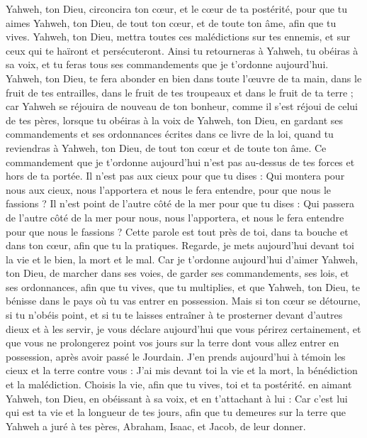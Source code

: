 \begin{multicols}{2}
Yahweh, ton Dieu, circoncira ton cœur, et le cœur de ta postérité, pour que tu aimes Yahweh, ton Dieu, de tout ton cœur, et de toute ton âme, afin que tu vives.
Yahweh, ton Dieu, mettra toutes ces malédictions sur tes ennemis, et sur ceux qui te haïront et persécuteront.
Ainsi tu retourneras à Yahweh, tu obéiras à sa voix, et tu feras tous ses commandements que je t’ordonne aujourd'hui.
Yahweh, ton Dieu, te fera abonder en bien dans toute l’œuvre de ta main, dans le fruit de tes entrailles, dans le fruit de tes troupeaux et dans le fruit de ta terre ; car Yahweh se réjouira de nouveau de ton bonheur, comme il s'est réjoui de celui de tes pères,
lorsque tu obéiras à la voix de Yahweh, ton Dieu, en gardant ses commandements et ses ordonnances écrites dans ce livre de la loi, quand tu reviendras à Yahweh, ton Dieu, de tout ton cœur et de toute ton âme.
Ce commandement que je t’ordonne aujourd'hui n'est pas au-dessus de tes forces et hors de ta portée.
Il n'est pas aux cieux pour que tu dises : Qui montera pour nous aux cieux, nous l’apportera et nous le fera entendre, pour que nous le fassions ?
Il n'est point de l’autre côté de la mer pour que tu dises : Qui passera de l’autre côté de la mer pour nous, nous l’apportera, et nous le fera entendre pour que nous le fassions ?
Cette parole est tout près de toi, dans ta bouche et dans ton cœur, afin que tu la pratiques.
Regarde, je mets aujourd'hui devant toi la vie et le bien, la mort et le mal.
Car je t’ordonne aujourd'hui d'aimer Yahweh, ton Dieu, de marcher dans ses voies, de garder ses commandements, ses lois, et ses ordonnances, afin que tu vives, que tu multiplies, et que Yahweh, ton Dieu, te bénisse dans le pays où tu vas entrer en possession.
Mais si ton cœur se détourne, si tu n'obéis point, et si tu te laisses entraîner à te prosterner devant d'autres dieux et à les servir,
je vous déclare aujourd'hui que vous périrez certainement, et que vous ne prolongerez point vos jours sur la terre dont vous allez entrer en possession, après avoir passé le Jourdain.
J’en prends aujourd'hui à témoin les cieux et la terre contre vous : J'ai mis devant toi la vie et la mort, la bénédiction et la malédiction. Choisis la vie\FTNT{}, afin que tu vives, toi et ta postérité.
en aimant Yahweh, ton Dieu, en obéissant à sa voix, et en t'attachant à lui : Car c’est lui qui est ta vie et la longueur de tes jours, afin que tu demeures sur la terre que Yahweh a juré à tes pères, Abraham, Isaac, et Jacob, de leur donner.

\end{multicols}
